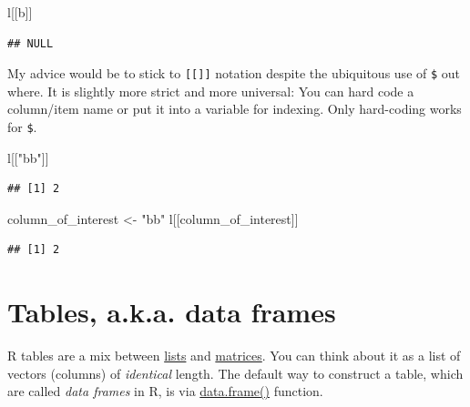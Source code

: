 \documentclass[
]{book}
\newenvironment{Shaded}{\begin{snugshade}}{\end{snugshade}}
\newcommand{\NormalTok}[1]{#1}
\newcommand{\OtherTok}[1]{\textcolor[rgb]{0.56,0.35,0.01}{#1}}
\newcommand{\StringTok}[1]{\textcolor[rgb]{0.31,0.60,0.02}{#1}}
\begin{document}
\begin{Shaded}
\begin{Highlighting}[]
\NormalTok{l[[}\StringTok{\textquotesingle{}b\textquotesingle{}}\NormalTok{]]}
\end{Highlighting}
\end{Shaded}

\begin{verbatim}
## NULL
\end{verbatim}

My advice would be to stick to \texttt{{[}{[}{]}{]}} notation despite the ubiquitous use of \texttt{\$} out where. It is slightly more strict and more universal: You can hard code a column/item name or put it into a variable for indexing. Only hard-coding works for \texttt{\$}.

\begin{Shaded}
\begin{Highlighting}[]
\NormalTok{l[[}\StringTok{"bb"}\NormalTok{]]}
\end{Highlighting}
\end{Shaded}

\begin{verbatim}
## [1] 2
\end{verbatim}

\begin{Shaded}
\begin{Highlighting}[]
\NormalTok{column\_of\_interest }\OtherTok{\textless{}{-}} \StringTok{"bb"}
\NormalTok{l[[column\_of\_interest]]}
\end{Highlighting}
\end{Shaded}

\begin{verbatim}
## [1] 2
\end{verbatim}

\hypertarget{data.frame}{%
\section{Tables, a.k.a. data frames}\label{data.frame}}

R tables are a mix between \href{https://stat.ethz.ch/R-manual/R-devel/library/base/html/list.html}{lists} and \href{https://stat.ethz.ch/R-manual/R-devel/library/base/html/matrix.html}{matrices}. You can think about it as a list of vectors (columns) of \emph{identical} length. The default way to construct a table, which are called \emph{data frames} in R, is via \href{https://www.rdocumentation.org/packages/base/versions/3.6.2/topics/data.frame}{data.frame()} function.
\end{document}
